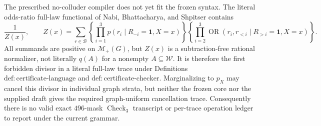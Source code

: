 The prescribed no-colluder compiler does not yet fit the frozen syntax. The literal odds-ratio full-law functional of Nabi, Bhattacharya, and Shpitser contains
\[
\frac{1}{Z(x)},\qquad
Z(x)=\sum_{r\in\mathcal B}
\left\{\prod_{i=1}^{3}p(r_i\mid R_{-i}=\mathbf1,X=x)\right\}
\left\{\prod_{i=2}^{3}\operatorname{OR}(r_i,r_{<i}\mid R_{>i}=\mathbf1,X=x)\right\}.
\]
All summands are positive on \(\mathcal M_+(G)\), but \(Z(x)\) is a subtraction-free rational normalizer, not literally \(q(A)\) for a nonempty \(A\subseteq\mathcal W\). It is therefore the first forbidden divisor in a literal full-law trace under Definitions \(\mathrm{def{:}certificate\text{-}language}\) and \(\mathrm{def{:}certificate\text{-}checker}\). Marginalizing to \(p_X\) may cancel this divisor in individual graph strata, but neither the frozen core nor the supplied draft gives the required graph-uniform cancellation trace. Consequently there is no valid exact \(496\)-mask \(\operatorname{Check}_3\) transcript or per-trace operation ledger to report under the current grammar.